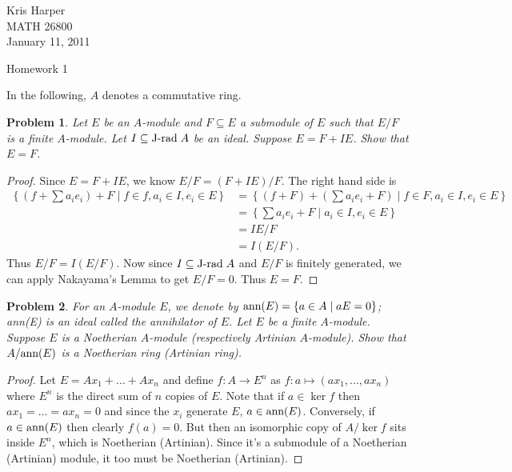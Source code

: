 \documentclass{article}
\newcommand{\J}{\textup{J-rad\;}}
\newcommand{\ann}{\textup{ann}}
\newtheorem{problem}{Problem}
\begin{document}
\begin{flushright}
Kris Harper\\

MATH 26800\\

January 11, 2011
\end{flushright}

\begin{center}
Homework 1
\end{center}

\noindent
In the following, $A$ denotes a commutative ring.

\begin{problem}
Let $E$ be an $A$-module and $F \subseteq E$ a submodule of $E$ such that $E/F$ is a finite $A$-module. Let $I \subseteq \J A$ be an ideal. Suppose $E = F + IE$. Show that $E = F$.
\end{problem}
\begin{proof}
Since $E = F + IE$, we know $E/F = (F + IE)/F$. The right hand side is
\begin{align*}
\left \{ \left (f + \sum a_ie_i \right ) + F \mid f \in f, a_i \in I, e_i \in E \right \}
&= \left \{(f + F) + \left (\sum a_ie_i + F \right ) \mid f \in F, a_i \in I, e_i \in E \right \}\\
&= \left \{\sum a_ie_i + F \mid a_i \in I, e_i \in E \right \}\\
&= IE/F\\
&= I(E/F).
\end{align*}
Thus $E/F = I(E/F)$. Now since $I \subseteq \J A$ and $E/F$ is finitely generated, we can apply Nakayama's Lemma to get $E/F = 0$. Thus $E = F$.
\end{proof}

\begin{problem}
For an $A$-module $E$, we denote by $\ann(E) = \{a \in A \mid aE = 0\}$; \ann(E) is an ideal called the annihilator of $E$. Let $E$ be a finite $A$-module. Suppose $E$ is a Noetherian $A$-module (respectively Artinian $A$-module). Show that $A/\ann(E)$ is a Noetherian ring (Artinian ring).
\end{problem}
\begin{proof}
Let $E = Ax_1 + \dots + Ax_n$ and define $f : A \to E^n$ as $f : a \mapsto (ax_1, \dots , ax_n)$ where $E^n$ is the direct sum of $n$ copies of $E$. Note that if $a \in \ker f$ then $ax_1 = \dots = ax_n = 0$ and since the $x_i$ generate $E$, $a \in \ann(E)$. Conversely, if $a \in \ann(E)$ then clearly $f(a) = 0$. But then an isomorphic copy of $A/\ker f$ sits inside $E^n$, which is Noetherian (Artinian). Since it's a submodule of a Noetherian (Artinian) module, it too must be Noetherian (Artinian).
\end{proof}
\end{document}
